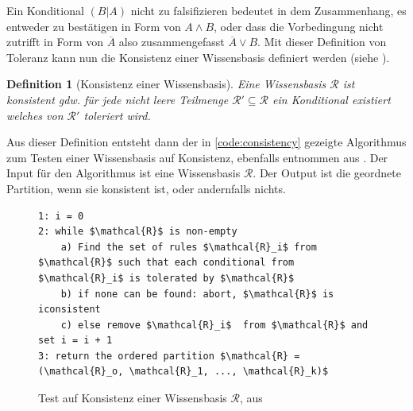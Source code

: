 \documentclass[12pt,a4paper]{article}
\newtheorem{theorem}{Definition}
\begin{document}
Ein Konditional $(B|A)$ nicht zu falsifizieren bedeutet in dem Zusammenhang, es entweder zu bestätigen in Form von $A \wedge B$, oder dass die Vorbedingung nicht zutrifft in Form von $\overline{A}$ also zusammengefasst $\overline{A} \vee B$. Mit dieser Definition von Toleranz kann nun die Konsistenz einer Wissensbasis definiert werden (siehe \cite{goldszmidt96}).
\begin{theorem}[Konsistenz einer Wissensbasis]
\label{def:konsistenz}
Eine Wissensbasis $\mathcal{R}$ ist konsistent gdw. für jede nicht leere Teilmenge $\mathcal{R}' \subseteq \mathcal{R}$ ein Konditional existiert welches von $\mathcal{R}'$ toleriert wird.
\end{theorem}
Aus dieser Definition entsteht dann der in \autoref{code:consistency} gezeigte Algorithmus zum Testen einer Wissensbasis auf Konsistenz, ebenfalls entnommen aus \cite{goldszmidt96}. Der Input für den Algorithmus ist eine Wissensbasis $\mathcal{R}$. Der Output ist die geordnete Partition, wenn sie konsistent ist, oder andernfalls nichts.


\begin{figure}[h]
\begin{lstlisting}[mathescape=true]
1: i = 0
2: while $\mathcal{R}$ is non-empty
	a) Find the set of rules $\mathcal{R}_i$ from $\mathcal{R}$ such that each conditional from $\mathcal{R}_i$ is tolerated by $\mathcal{R}$
	b) if none can be found: abort, $\mathcal{R}$ is iconsistent
	c) else remove $\mathcal{R}_i$  from $\mathcal{R}$ and set i = i + 1
3: return the ordered partition $\mathcal{R} = (\mathcal{R}_o, \mathcal{R}_1, ..., \mathcal{R}_k)$
\end{lstlisting}

\caption{Test auf Konsistenz einer Wissensbasis $\mathcal{R}$, aus \cite{goldszmidt96}}
\label{code:consistency}

\end{figure}
\end{document}
